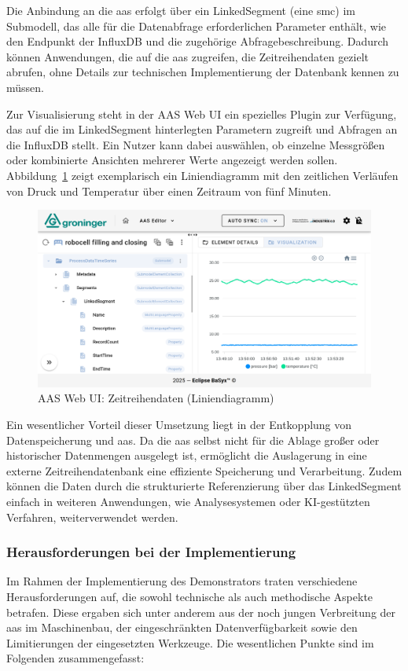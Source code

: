 Die Anbindung an die \acs{aas} erfolgt über ein LinkedSegment (eine \acs{smc}) im Submodell, das alle für die Datenabfrage erforderlichen Parameter enthält, wie den Endpunkt der InfluxDB und die zugehörige Abfragebeschreibung. 
Dadurch können Anwendungen, die auf die \acs{aas} zugreifen, die Zeitreihendaten gezielt abrufen, ohne Details zur technischen Implementierung der Datenbank kennen zu müssen.

Zur Visualisierung steht in der AAS Web UI ein spezielles Plugin zur Verfügung, das auf die im LinkedSegment hinterlegten Parametern zugreift und Abfragen an die InfluxDB stellt. 
Ein Nutzer kann dabei auswählen, ob einzelne Messgrößen oder kombinierte Ansichten mehrerer Werte angezeigt werden sollen. 
Abbildung~\ref{fig:LiniendiagrammBaSyx} zeigt exemplarisch ein Liniendiagramm mit den zeitlichen Verläufen von Druck und Temperatur über einen Zeitraum von fünf Minuten.

\begin{figure}[htbp]
    \centering
        \includegraphics[width=1\textwidth]{Bilder/ErgebnisseAASWebUI/Zeitreihen.png}
    \caption{AAS Web UI: Zeitreihendaten (Liniendiagramm)}
    \label{fig:LiniendiagrammBaSyx}
\end{figure}
\vspace{-0.5em}

Ein wesentlicher Vorteil dieser Umsetzung liegt in der Entkopplung von Datenspeicherung und \acs{aas}. 
Da die \acs{aas} selbst nicht für die Ablage großer oder historischer Datenmengen ausgelegt ist, ermöglicht die Auslagerung in eine externe Zeitreihendatenbank eine effiziente Speicherung und Verarbeitung. 
Zudem können die Daten durch die strukturierte Referenzierung über das LinkedSegment einfach in weiteren Anwendungen, wie Analysesystemen oder KI-gestützten Verfahren, weiterverwendet werden.

\subsubsection{Herausforderungen bei der Implementierung}
Im Rahmen der Implementierung des Demonstrators traten verschiedene Herausforderungen auf, die sowohl technische als auch methodische Aspekte betrafen. 
Diese ergaben sich unter anderem aus der noch jungen Verbreitung der \acs{aas} im Maschinenbau, der eingeschränkten Datenverfügbarkeit sowie den Limitierungen der eingesetzten Werkzeuge. 
Die wesentlichen Punkte sind im Folgenden zusammengefasst:

